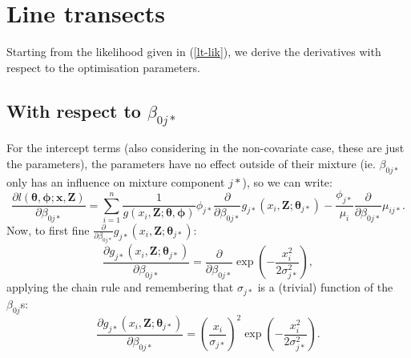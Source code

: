 \label{app-mixderivs}

\section{Line transects}

Starting from the likelihood given in (\ref{lt-lik}), we derive the derivatives with respect to the optimisation parameters.

\subsection{With respect to $\beta_{0j*}$}
For the intercept terms (also considering in the non-covariate case, these are just the parameters), the parameters have no effect outside of their mixture (ie. $\beta_{0j*}$ only has an influence on mixture component $j*$), so we can write:
\begin{equation*}
\frac{\partial l\left (\bm{\theta},\bm{\phi}; \mathbf{x},\mathbf{Z}\right )}{\partial \beta_{0j*}} = \sum_{i=1}^n \frac{1}{g\left (x_i,\mathbf{Z}; \bm{\theta},\bm{\phi}\right )} \phi_{j*} \frac{\partial}{\partial \beta_{0j*}} g_{j*}\left (x_i,\mathbf{Z}; \bm{\theta}_{j*}\right )  - \frac{\phi_{j*}}{\mu_i}  \frac{\partial}{\partial \beta_{0j*}} \mu_{ij*}.
\end{equation*}
Now, to first fine $\frac{\partial}{\partial \beta_{0j*}} g_{j*}\left (x_i,\mathbf{Z}; \bm{\theta}_{j*}\right )$:
\begin{equation*}
\frac{\partial g_{j*}\left (x_i,\mathbf{Z}; \bm{\theta}_{j*}\right )}{\partial \beta_{0j*}} = \frac{\partial}{\partial \beta_{0j*}} \exp\left ( -\frac{x_i^2}{2\sigma_{j*}^2} \right ),
\end{equation*}
applying the chain rule and remembering that $\sigma_{j*}$ is a (trivial) function of the $\beta_{0j}$s:
\begin{equation*}
\frac{\partial g_{j*}\left (x_i,\mathbf{Z}; \bm{\theta}_{j*} \right )}{\partial \beta_{0j*}} = \left ( \frac{x_i}{\sigma_{j*}}\right )^2 \exp \left (-\frac{x_i^2}{2 \sigma_{j*}^2}\right ).
\end{equation*}

